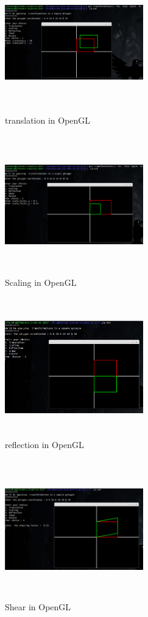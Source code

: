 
\begin{figure}[ht!]
\centering
\includegraphics[width=60mm, height=60mm]{translationOpenGL.png}
\caption{translation in OpenGL \label{overflow}}
\end{figure}
\begin{figure}[ht!]
\centering
\includegraphics[width=60mm, height=60mm]{scalingOpenGL.png}
\caption{Scaling in OpenGL \label{overflow}}
\end{figure}
\begin{figure}[ht!]
\centering
\includegraphics[width=60mm, height=60mm]{reflectionOpenGL.png}
\caption{reflection in OpenGL \label{overflow}}
\end{figure}
\begin{figure}[ht!]
\centering
\includegraphics[width=60mm, height=60mm]{shearOpenGL.png}
\caption{Shear in OpenGL \label{overflow}}
\end{figure}
